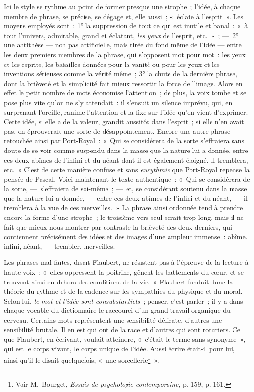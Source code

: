 \documentclass[french,twoside]{book} %
\begin{document}
\noindent Ici le style se rythme au point de former presque une strophe ; l’idée, à chaque membre de phrase, se précise, se dégage et, elle aussi ; « éclate à l’esprit ». Les moyens employés sont : 1° la suppression de tout ce qui est inutile et banal : « à tout l’univers, admirable, grand et éclatant, \emph{les yeux} de l’esprit, etc. » ; — 2° une antithèse — non pas artificielle, mais tirée du fond même de l’idée — entre les deux premiers membres de la phrase, qui s’opposent mot pour mot : les yeux et les esprits, les batailles données pour la vanité ou pour les yeux et les inventions sérieuses comme la vérité même ; 3° la chute de la dernière phrase, dont la brièveté et la simplicité fait mieux ressortir la force de l’image. Alors en effet le petit nombre de mots économise l’attention ; de plus, la voix tombe et se pose plus vite qu’on ne s’y attendait : il s’ensuit un silence imprévu, qui, en surprenant l’oreille, ranime l’attention et la fixe sur l’idée qu’on vient d’exprimer. Cette idée, si elle a de la valeur, grandit aussitôt dans l’esprit ; si elle n’en avait pas, on éprouverait une sorte de désappointement. Encore une autre phrase retouchée ainsi par Port-Royal : « Qui se considérera de la sorte s’effraiera sans doute de se voir comme suspendu dans la masse que la nature lui a donnée, entre ces deux abîmes de l’infini et du néant dont il est également éloigné. Il tremblera, etc. » C’est de cette manière confuse et sans \emph{eurythmie} que Port-Royal repense la pensée de Pascal. Voici maintenant le texte authentique : « Qui se considérera de la sorte, — s’effraiera de soi-même ; — et, se considérant soutenu dans la masse que la nature lui a donnée, — entre ces deux abîmes de l’infini et du néant, — il tremblera à la vue de ces merveilles. » La phrase ainsi ordonnée tend à prendre encore la forme d’une strophe ; le troisième vers seul serait trop long, mais il ne fait que mieux nous montrer par contraste la brièveté des deux derniers, qui contiennent précisément des idées et des images d’une ampleur immense : abîme, infini, néant, — trembler, merveilles.\par
Les phrases mal faites, disait Flaubert, ne résistent pas à l’épreuve de la lecture à haute voix : « elles oppressent la poitrine, gênent les battements du cœur, et se trouvent ainsi en dehors des conditions de la vie. » Flaubert fondait donc la théorie du rythme et de la cadence sur les sympathies du physique et du moral. Selon lui, \emph{le mot et l’idée sont consubstantiels} ; penser, c’est parler ; il y a dans chaque vocable du dictionnaire le raccourci d’un grand travail organique du cerveau. Certains mots représentent une sensibilité délicate, d’autres une sensibilité brutale. Il en est qui ont de la race et d’autres qui sont roturiers. Ce que Flaubert, en écrivant, voulait atteindre, « c’était le terme sans synonyme », qui est le corps vivant, le corps unique de l’idée. Aussi écrire était-il pour lui, ainsi qu’il le disait quelquefois, « une sorcellerie\footnote{ Voir M. Bourget, \emph{Essais de psychologie contemporaine}, p. 159, p. 161.} ».\par
\end{document}

